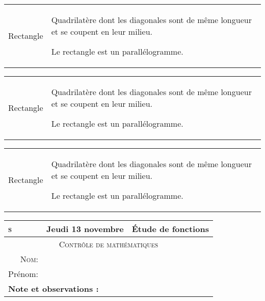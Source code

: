 \documentclass[10pt,french]{article}
\begin{document}
\begin{tabular}{r|p{4.5cm}}
    Rectangle & Quadrilat\`ere dont les diagonales
    sont de m\^eme longueur et
    se coupent en leur milieu.\par
    Le rectangle est un parall\'elogramme.
\end{tabular}\bigskip

\begin{tabular}{r|m{4.5cm}}
    Rectangle & Quadrilat\`ere dont les diagonales
    sont de m\^eme longueur et
    se coupent en leur milieu.\par
    Le rectangle est un parall\'elogramme.
\end{tabular}\bigskip

\begin{tabular}{r|b{4.5cm}}
    Rectangle & Quadrilat\`ere dont les diagonales
    sont de m\^eme longueur et
    se coupent en leur milieu.\par
    Le rectangle est un parall\'elogramme.
\end{tabular}\bigskip

\begin{tabular}{|m{2.5cm}|m{9cm}|m{2.5cm}|}
	\hline
		\centering 1\iere \textsc{s} & \centering  Jeudi 13 novembre \np{2014} & \centering \textbf{\'Etude de fonctions} \tabularnewline
	\hline
		\multicolumn{3}{|c|}{\textsc{Contrôle de mathématiques}} \\
	\hline
        \multicolumn{1}{|r}{\textsc{Nom}:} & \multicolumn{2}{l|}{} \\
		\multicolumn{1}{|r}{Prénom:} & \multicolumn{2}{l|}{} \\
	\hline
        \multicolumn{3}{|l|}{\bfseries Note et observations :} \\[1cm]
    \hline
\end{tabular}
\bigskip


\bigskip

\bigskip

\end{document}
